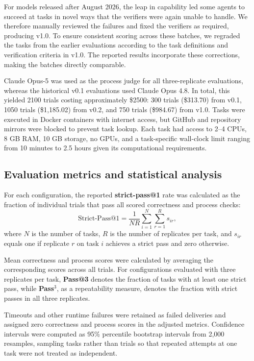 For models released after August 2026, the leap in capability led some agents to succeed at tasks in novel ways that the verifiers were again unable to handle. We therefore manually reviewed the failures and fixed the verifiers as required, producing v1.0. To ensure consistent scoring across these batches, we regraded the tasks from the earlier evaluations according to the task definitions and verification criteria in v1.0. The reported results incorporate these corrections, making the batches directly comparable.

Claude Opus-5 was used as the process judge for all three-replicate evaluations, whereas the historical v0.1 evaluations used Claude Opus 4.8. In total, this yielded 2100 trials costing approximately \$2500: 300 trials (\$313.70) from v0.1, 1050 trials (\$1,185.02) from v0.2, and 750 trials (\$984.67) from v1.0. Tasks were executed in Docker containers with internet access, but GitHub and repository mirrors were blocked to prevent task lookup. Each task had access to 2--4 CPUs, 8 GB RAM, 10 GB storage, no GPUs, and a task-specific wall-clock limit ranging from 10 minutes to 2.5 hours given its computational requirements.

\subsection{Evaluation metrics and statistical analysis}

For each configuration, the reported \textbf{strict-pass@1} rate was calculated as the fraction of individual trials that pass all scored correctness and process checks:
\begin{equation}
  \text{Strict-Pass@1} = \frac{1}{NR} \sum_{i=1}^{N} \sum_{r=1}^{R} s_{ir},
\end{equation}
where $N$ is the number of tasks, $R$ is the number of replicates per task, and $s_{ir}$ equals one if replicate $r$ on task $i$ achieves a strict pass and zero otherwise. 

Mean correctness and process scores were calculated by averaging the corresponding scores across all trials. For configurations evaluated with three replicates per task, \textbf{Pass@3} denotes the fraction of tasks with at least one strict pass, while \textbf{Pass$^3$}, as a repeatability measure, denotes the fraction with strict passes in all three replicates.

Timeouts and other runtime failures were retained as failed deliveries and assigned zero correctness and process scores in the adjusted metrics. Confidence intervals were computed as 95\% percentile bootstrap intervals from 2,000 resamples, sampling tasks rather than trials so that repeated attempts at one task were not treated as independent.

